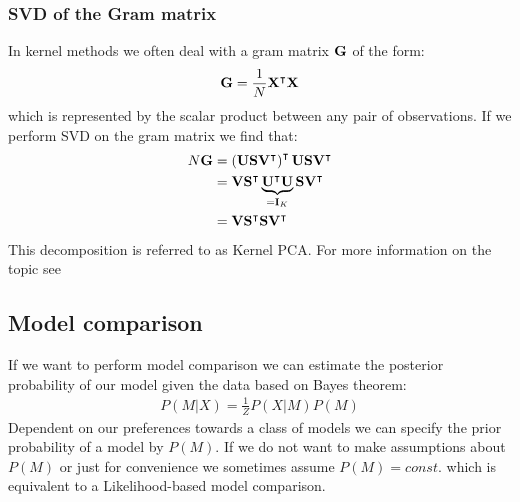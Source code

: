 \subsubsection{SVD of the Gram matrix}
In kernel methods we often deal with a gram matrix $\mathbf{G}$ of the form:
\begin{align}
	\mathbf{G} = \frac{1}{N} \mathbf{X^\intercal X}
\end{align}
which is represented by the scalar product between any pair of observations. If we perform
SVD on the gram matrix we find that:
\begin{align}
	\begin{split}
	N \mathbf{G} &= \left( \mathbf{U S V^\intercal} \right) ^\intercal \mathbf{U S V^\intercal} \\
			 &= \mathbf{V S^\intercal} \underbrace{\mathbf{U^\intercal U}}_{= \operatorname{\mathbf{I}}_K} \mathbf{S V^\intercal}	 \\
			 &= \mathbf{V S^\intercal S V^\intercal}
	\end{split}			
\end{align}
This decomposition is referred to as Kernel PCA. For more information on the topic see 
\cite[Chapter 6 \& 12.3]{Bishop2006}

\subsection{Model comparison}
If we want to perform model comparison we can estimate the posterior probability of our 
model given the data based on Bayes theorem:
\begin{align}
	P(M|X) = \frac{1}{Z} P(X|M)P(M)
\end{align}
Dependent on our preferences towards a class of models we can specify the prior probability of
a model by $P(M)$. If we do not want to make assumptions about $P(M)$ or just for convenience
we sometimes assume $P(M) = const.$ which is equivalent to a Likelihood-based model comparison.

